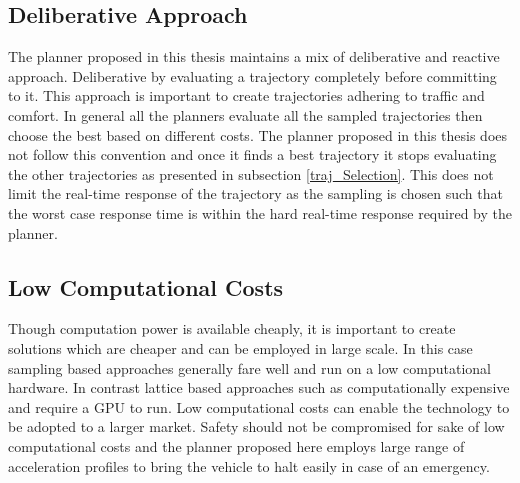
\subsection{Deliberative Approach}
The planner proposed in this thesis maintains a mix of deliberative and reactive approach. Deliberative by evaluating a trajectory completely  before committing to it. This approach is important to create trajectories adhering to traffic and comfort. In general all the planners evaluate all the sampled trajectories then choose the best based on different costs. The planner proposed in this thesis does not follow this convention and once it finds a best trajectory it stops evaluating the other trajectories as presented in subsection \ref{traj_Selection}. This does not limit the real-time response of the trajectory as the sampling is chosen such that the worst case response time is within the hard real-time response required by the planner. 

\subsection{Low Computational Costs}

Though computation power is available cheaply, it is important to create solutions which are cheaper and can be employed in large scale. In this case sampling based approaches generally fare well and run on a low computational hardware. In contrast lattice based approaches such as \cite{cmu_parallel_thesis} \cite{diss_shui_phd_thesis} \cite{werling_frenet} computationally expensive and require a GPU to run. Low computational costs can enable the technology to be adopted to a larger market. Safety should not be compromised for sake of low computational costs and the planner proposed here employs large range of acceleration profiles to bring the vehicle to halt easily in case of an emergency.




